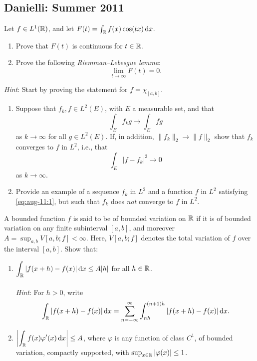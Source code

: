 \subsection{Danielli: Summer 2011}
\setcounter{exercise}{0}
\setcounter{equation}{0}

\begin{problem}
Let $f\in L^1(\mathbb{R})$, and let $F(t)=\int_{\mathbb{R}} f(x)\cos(tx)\mathop{}\!\mathrm{d} x$.
\begin{enumerate}[label=(\alph*),noitemsep]
\item Prove that $F(t)$ is continuous for $t\in\mathbb{R}$.
\item Prove the following \emph{Riemman--Lebesgue lemma}:
\[
\lim_{t\to\infty}F(t)=0.
\]
\end{enumerate}
\emph{Hint}: Start by proving the statement for $f=\chi_{[a,b]}$.
\end{problem}
\begin{solution}
\end{solution}

\begin{problem}
\begin{enumerate}[label=(\alph*),noitemsep]
\item Suppose that $f_k,f\in L^2(E)$, with $E$ a measurable set, and that
\begin{equation}
\label{eq:aug-11:1}
\int_E f_kg\longrightarrow\int_E fg
\end{equation}
as $k\to\infty$ for all $g\in L^2(E)$. If, in addition,
$\|f_k\|_2\to\|f\|_2$ show that $f_k$ converges to $f$ in $L^2$, i.e., that
\[
\int_E|f-f_k|^2\longrightarrow 0
\]
as $k\to\infty$.
\item Provide an example of a sequence $f_k$ in $L^2$ and a function $f$ in
  $L^2$ satisfying \eqref{eq:aug-11:1}, but such that $f_k$ does \emph{not}
  converge to $f$ in $L^2$.
\end{enumerate}
\end{problem}
\begin{solution}
\end{solution}

\begin{problem}
A bounded function $f$ is said to be of bounded variation on $\mathbb{R}$ if it
is of bounded variation on any finite subinterval $[a,b]$, and moreover
$A=\sup_{a,b}V[a,b;f]<\infty$. Here, $V[a,b;f]$ denotes the total
variation of $f$ over the interval $[a,b]$. Show that:
\begin{enumerate}[label=(\alph*),noitemsep]
\item $\displaystyle\int_{\mathbb{R}}|f(x+h)-f(x)|\mathop{}\!\mathrm{d} x\leq A|h|$ for all
  $h\in\mathbb{R}$.
\\\\
\emph{Hint}: For $h>0$, write
\[
\int_{\mathbb{R}} |f(x+h)-f(x)|\mathop{}\!\mathrm{d} x=
\sum_{n=-\infty}^\infty\int_{nh}^{(n+1)h}|f(x+h)-f(x)|\mathop{}\!\mathrm{d} x.
\]
\item $\displaystyle\left|\int_{\mathbb{R}} f(x)\varphi'(x)\mathop{}\!\mathrm{d} x\right|\leq A$,
  where $\varphi$ is any function of class $C^1$, of bounded variation,
  compactly supported, with $\sup_{x\in\mathbb{R}}|\varphi(x)|\leq 1$.
\end{enumerate}
\end{problem}
\begin{solution}
\end{solution}

